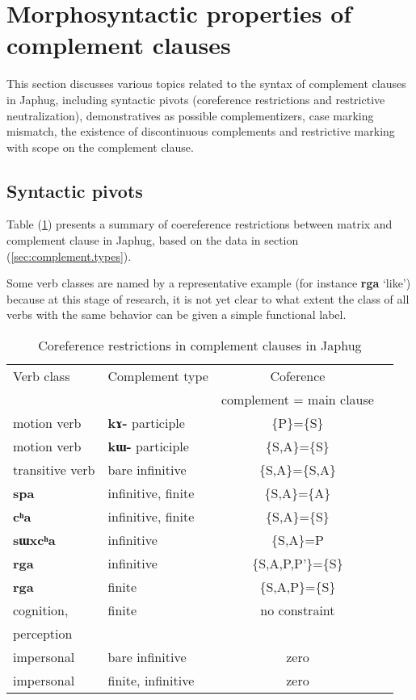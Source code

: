 \documentclass[oneside,a4paper,11pt]{article}
\newcommand{\ipa}[1]{\textbf{\phon#1}} %
\newcommand{\jpg}[2]{\ipa{#1} `#2'} %
\begin{document}
\section{Morphosyntactic properties of complement clauses} 
This section discusses various topics related to the syntax of complement clauses in Japhug, including syntactic pivots (coreference restrictions and restrictive neutralization), demonstratives as possible complementizers, case marking mismatch, the existence of discontinuous complements and restrictive marking with scope on the complement clause.

 \subsection{Syntactic pivots} 
Table (\ref{tab:coref}) presents a summary of coereference restrictions between matrix and complement clause in Japhug, based on the data in section (\ref{sec:complement.types}).

Some verb classes are named by a representative example (for instance \jpg{rga}{like}) because at this stage of research, it is not yet clear to what extent the class of all verbs with the same behavior can be given a simple functional label.

\begin{table}[H]
\caption{Coreference restrictions in complement clauses in Japhug} \label{tab:coref} \centering
\begin{tabular}{llcc}
\toprule
Verb class & 	Complement type & 	Coference & 	\\
&& complement = main clause \\
\midrule
motion verb & 	\ipa{kɤ-} participle & 	\{P\}=\{S\} & 	\\
\midrule
motion verb & 	\ipa{kɯ-} participle & 	\{S,A\}=\{S\} & 	\\
transitive verb & 	bare infinitive & 	\{S,A\}=\{S,A\} & 	\\
\ipa{spa} & 	infinitive, finite & 	\{S,A\}=\{A\} & 	\\
\ipa{cʰa} & 	infinitive, finite & 	\{S,A\}=\{S\} & 	\\
\ipa{sɯxcʰa} & 	infinitive & 	\{S,A\}=P & 	\\
\midrule
\ipa{rga} & 	infinitive & 	\{S,A,P,P'\}=\{S\} & 	\\
\ipa{rga} & 	finite & 	\{S,A,P\}=\{S\} & 	\\
\midrule
cognition, & finite & no constraint \\
perception \\
impersonal & 	bare infinitive & 	zero & 	\\
impersonal & 	finite, infinitive & 	zero & 	\\
\bottomrule
\end{tabular}
\end{table}
\end{document}

